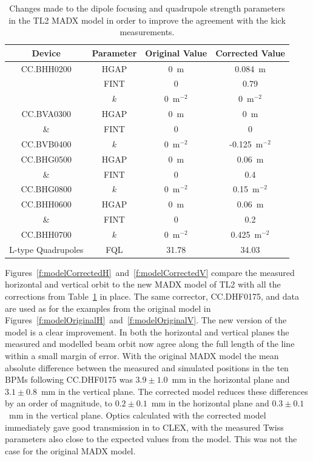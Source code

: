\begin{table}
  \begin{center}
    \begin{tabular}{|c c c c|}
	    \hline
        Device & Parameter & Original Value & Corrected Value\\ \hline
		CC.BHH0200 & HGAP & 0~m & 0.084~m \\
		 	       & FINT & 0 & 0.79 \\
		           & \(k\) & 0~\(\mathrm{m^{-2}}\) & 0~\(\mathrm{m^{-2}}\) \\ \hline
		CC.BVA0300   & HGAP & 0~m & 0~m \\
		 	 \&      & FINT & 0 & 0 \\
		CC.BVB0400   & \(k\) & 0~\(\mathrm{m^{-2}}\) & -0.125~\(\mathrm{m^{-2}}\) \\ \hline
		CC.BHG0500   & HGAP & 0~m & 0.06~m \\
		 	 \&      & FINT & 0 & 0.4 \\
		CC.BHG0800   & \(k\) & 0~\(\mathrm{m^{-2}}\) & 0.15~\(\mathrm{m^{-2}}\) \\ \hline
		CC.BHH0600   & HGAP & 0~m & 0.06~m \\
		 	 \&      & FINT & 0 & 0.2 \\
		CC.BHH0700   & \(k\) & 0~\(\mathrm{m^{-2}}\) & 0.425~\(\mathrm{m^{-2}}\) \\ \hline
		L-type Quadrupoles & FQL & 31.78 & 34.03 \\
	   \hline
    \end{tabular}
    \caption{Changes made to the dipole focusing and quadrupole strength parameters in the TL2 MADX model in order to improve the agreement with the kick measurements.}
  	\label{t:tl2ModelChanges}
  \end{center}
\end{table}

Figures~\ref{f:modelCorrectedH}~and~\ref{f:modelCorrectedV} compare the measured horizontal and vertical orbit to the new MADX model of TL2 with all the corrections from Table~\ref{t:tl2ModelChanges} in place. The same corrector, CC.DHF0175, and data are used as for the examples from the original model in Figures~\ref{f:modelOriginalH}~and~\ref{f:modelOriginalV}. The new version of the model is a clear improvement. In both the horizontal and vertical planes the measured and modelled beam orbit now agree along the full length of the line within a small margin of error. With the original MADX model the mean absolute difference between the measured and simulated positions in the ten BPMs following CC.DHF0175 was \(3.9\pm1.0\)~mm in the horizontal plane and \(3.1\pm0.8\)~mm in the vertical plane. The corrected model reduces these differences by an order of magnitude, to \(0.2\pm0.1\)~mm in the horizontal plane and \(0.3\pm0.1\)~mm in the vertical plane. Optics calculated with the corrected model immediately gave good transmission in to CLEX, with the measured Twiss parameters also close to the expected values from the model. This was not the case for the original MADX model.

